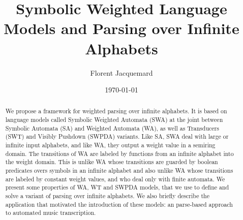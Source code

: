 \documentclass[runningheads]{llncs}
\title{Symbolic Weighted Language Models and Parsing over Infinite Alphabets}
\author{Florent Jacquemard}
\institute{INRIA \& CNAM, Paris, France\\
\email{florent.jacquemard@inria.fr}}
\date{\today}
\begin{document}
\thispagestyle{empty}
\maketitle

\begin{abstract}
We propose a framework for weighted parsing over infinite alphabets.
%
It is based on language models called Symbolic Weighted Automata (SWA) 
at the joint %
between Symbolic Automata (SA) and Weighted Automata (WA), 
as well as Transducers (SWT) and Visibly Pushdown (SWPDA) variants.
%
Like SA, SWA deal with large or infinite input alphabets, 
and like WA, they output a weight value in a semiring domain.
The transitions of WA are labeled by functions from an infinite alphabet into the weight domain. 
This is unlike WA whose transitions are guarded by boolean predicates 
overs symbols in an infinite alphabet 
and also unlike WA whose transitions are labeled by constant weight values, 
and who deal only with finite automata.
%
We present some properties of WA, WT and SWPDA models, 
that we use to define and solve a variant of parsing 
over infinite alphabets.
%
We also briefly describe the application that motivated the introduction of these models: 
an parse-based approach to automated music transcription.
\end{abstract}



\end{document}
